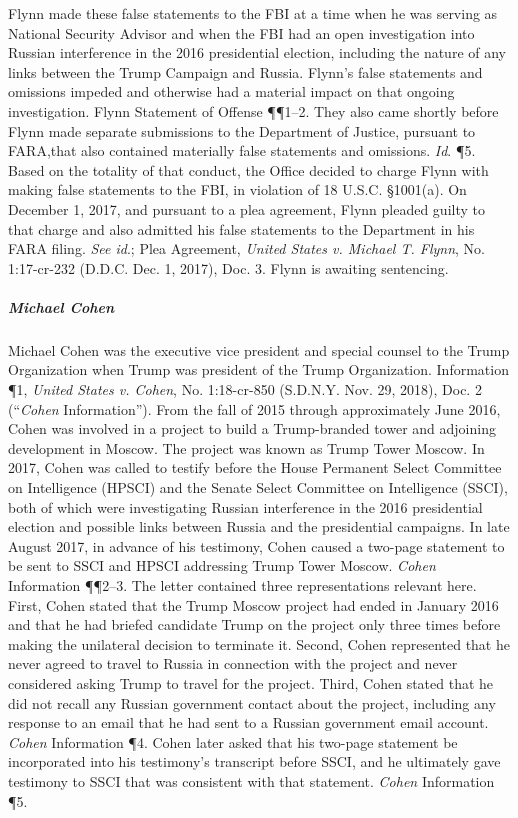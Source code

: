 Flynn made these false statements to the FBI at a time when he was serving as National Security Advisor and when the FBI had an open investigation into Russian interference in the 2016 presidential election, including the nature of any links between the Trump Campaign and Russia.
Flynn's false statements and omissions impeded and otherwise had a material impact on that ongoing investigation.
Flynn Statement of Offense \P\P 1--2.
They also came shortly before Flynn made separate submissions to the Department of Justice, pursuant to FARA,that also contained materially false statements and omissions.
\textit{Id}. \P 5.
Based on the totality of that conduct, the Office decided to charge Flynn with making false statements to the FBI, in violation of 18 U.S.C. \S 1001(a).
On December 1, 2017, and pursuant to a plea agreement, Flynn pleaded guilty to that charge and also admitted his false statements to the Department in his FARA filing.
\textit{See id}.; Plea Agreement, \textit{United States v. Michael T. Flynn}, No. 1:17-cr-232 (D.D.C. Dec. 1, 2017), Doc. 3.
Flynn is awaiting sentencing.

\subparagraph{Michael Cohen}
Michael Cohen was the executive vice president and special counsel to the Trump Organization when Trump was president of the Trump Organization.
Information \P 1, \textit{United States v. Cohen}, No. 1:18-cr-850 (S.D.N.Y. Nov. 29, 2018), Doc. 2 (``\textit{Cohen} Information'').
From the fall of 2015 through approximately June 2016, Cohen was involved in a project to build a Trump-branded tower and adjoining development in Moscow.
The project was known as Trump Tower Moscow.
In 2017, Cohen was called to testify before the House Permanent Select Committee on Intelligence (HPSCI) and the Senate Select Committee on Intelligence (SSCI), both of which were investigating Russian interference in the 2016 presidential election and possible links between Russia and the presidential campaigns.
In late August 2017, in advance of his testimony, Cohen caused a two-page statement to be sent to SSCI and HPSCI addressing Trump Tower Moscow.
\textit{Cohen} Information \P\P 2--3.
The letter contained three representations relevant here.
First, Cohen stated that the Trump Moscow project had ended in January 2016 and that he had briefed candidate Trump on the project only three times before making the unilateral decision to terminate it.
Second, Cohen represented that he never agreed to travel to Russia in connection with the project and never considered asking Trump to travel for the project.
Third, Cohen stated that he did not recall any Russian government contact about the project, including any response to an email that he had sent to a Russian government email account.
\textit{Cohen} Information \P 4.
Cohen later asked that his two-page statement be incorporated into his testimony's transcript before SSCI, and he ultimately gave testimony to SSCI that was consistent with that statement.
\textit{Cohen} Information \P 5.

